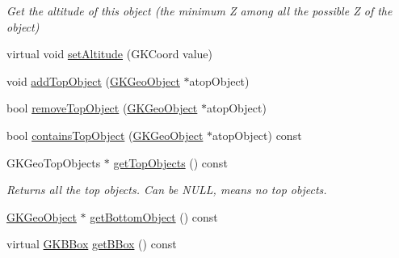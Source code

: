 \begin{DoxyCompactItemize}
\begin{DoxyCompactList}\small\item\em Get the altitude of this object (the minimum Z among all the possible Z of the object) \end{DoxyCompactList}\item 
virtual void \hyperlink{classGKGeoObject_a2891f402d1030c8e89cef8483b416e73}{set\+Altitude} (G\+K\+Coord value)
\item 
void \hyperlink{classGKGeoObject_ac4029be1854b1cb8796dfe0973f7ca8d}{add\+Top\+Object} (\hyperlink{classGKGeoObject}{G\+K\+Geo\+Object} $\ast$atop\+Object)
\item 
bool \hyperlink{classGKGeoObject_aee570d7157bff565aaa862bfb79bb1ce}{remove\+Top\+Object} (\hyperlink{classGKGeoObject}{G\+K\+Geo\+Object} $\ast$atop\+Object)
\item 
bool \hyperlink{classGKGeoObject_adcdf58a21dfa1ae17f2cb69f55631750}{contains\+Top\+Object} (\hyperlink{classGKGeoObject}{G\+K\+Geo\+Object} $\ast$atop\+Object) const 
\item 
G\+K\+Geo\+Top\+Objects $\ast$ \hyperlink{classGKGeoObject_a4ad5c1d5ddb758e4b0eb1c568ea02a57}{get\+Top\+Objects} () const \hypertarget{classGKGeoObject_a4ad5c1d5ddb758e4b0eb1c568ea02a57}{}\label{classGKGeoObject_a4ad5c1d5ddb758e4b0eb1c568ea02a57}

\begin{DoxyCompactList}\small\item\em Returns all the top objects. Can be N\+U\+LL, means no top objects. \end{DoxyCompactList}\item 
\hyperlink{classGKGeoObject}{G\+K\+Geo\+Object} $\ast$ \hyperlink{classGKGeoObject_a6b0caeaefb7b5a75aa48cb34638517f3}{get\+Bottom\+Object} () const 
\item 
virtual \hyperlink{classGKBBox}{G\+K\+B\+Box} \hyperlink{classGKGeoObject_ab878506693e9aaf26fc11b01212b0805}{get\+B\+Box} () const \hypertarget{classGKGeoObject_ab878506693e9aaf26fc11b01212b0805}{}\label{classGKGeoObject_ab878506693e9aaf26fc11b01212b0805}


\end{DoxyCompactItemize}
